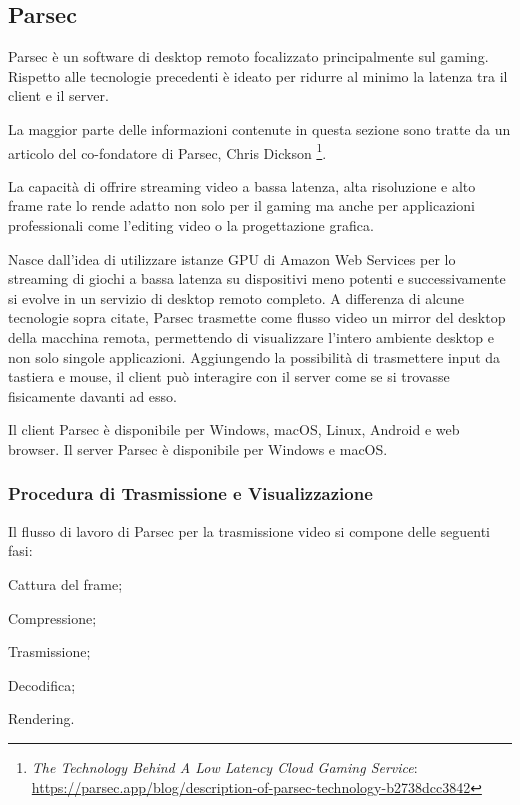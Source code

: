 \documentclass[12pt,a4paper,openright,twoside]{book}
\begin{document}
\subsection{Parsec}
\label{sec:parsec}
Parsec è un software di desktop remoto focalizzato principalmente sul gaming. Rispetto alle tecnologie precedenti è ideato per ridurre al minimo la latenza tra il client e il server.

La maggior parte delle informazioni contenute in questa sezione sono tratte da un articolo del co-fondatore di Parsec, Chris Dickson \footnote{\emph{The Technology Behind A Low Latency Cloud Gaming Service}: \url{https://parsec.app/blog/description-of-parsec-technology-b2738dcc3842}}.

La capacità di offrire streaming video a bassa latenza, alta risoluzione e alto frame rate lo rende adatto non solo per il gaming ma anche per applicazioni professionali come l'editing video o la progettazione grafica.

Nasce dall'idea di utilizzare istanze GPU di Amazon Web Services per lo streaming di giochi a bassa latenza su dispositivi meno potenti e successivamente si evolve in un servizio di desktop remoto completo.
%
A differenza di alcune tecnologie sopra citate,
Parsec trasmette come flusso video un mirror del desktop della macchina remota,
permettendo di visualizzare l'intero ambiente desktop e non solo singole applicazioni.
Aggiungendo la possibilità di trasmettere input da tastiera e mouse, il client può interagire con il server come se si trovasse fisicamente davanti ad esso.

Il client Parsec è disponibile per Windows, macOS, Linux, Android e web browser. Il server Parsec è disponibile per Windows e macOS. 

\subsubsection{Procedura di Trasmissione e Visualizzazione}

Il flusso di lavoro di Parsec per la trasmissione video si compone delle seguenti fasi:
\begin{inlinelist}
    \item Cattura del frame;
    \item Compressione;
    \item Trasmissione;
    \item Decodifica;
    \item Rendering.
\end{inlinelist}
\end{document}
